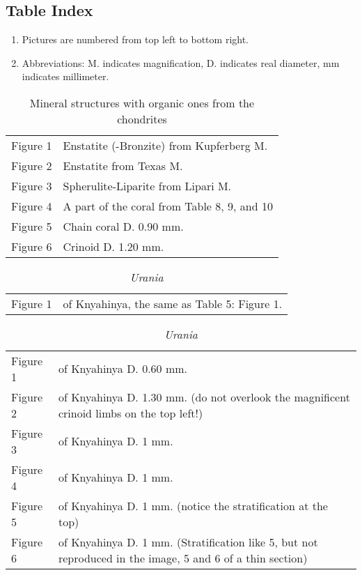 \documentclass[a4paper, 12pt, oneside]{article}
\begin{document}
\subsection{Table Index}
\begin{enumerate}
    \item Pictures are numbered from top left to bottom right.
    \item Abbreviations: M. indicates magnification, D. indicates real diameter, mm indicates millimeter.
\end{enumerate}
\begin{table}[ht!]
\caption{Mineral structures with organic ones from the chondrites}
\centering
\begin{tabular}{ p{2cm} p{10cm} }
\hline
 Figure 1 & Enstatite (-Bronzite) from Kupferberg M. \\
 Figure 2 & Enstatite from Texas M. \\
 Figure 3 & Spherulite-Liparite from Lipari M. \\
 Figure 4 & A part of the coral from Table 8, 9, and 10 \\
 Figure 5 & Chain coral D. 0.90 mm. \\
 Figure 6 & Crinoid D. 1.20 mm.
\end{tabular}
\label{table:1}
\end{table}
\begin{table}[ht!]
\caption{\emph{Urania}}
\centering
\begin{tabular}{ p{2cm} p{10cm} }
\hline
 Figure 1 & of Knyahinya, the same as Table 5: Figure 1.
\end{tabular}
\label{table:2}
\end{table}
\begin{table}[ht!]
\caption{\emph{Urania}}
\centering
\begin{tabular}{ p{2cm} p{10cm} }
\hline
 Figure 1 & of Knyahinya D. 0.60 mm. \\
 Figure 2 & of Knyahinya D. 1.30 mm. (do not overlook the magnificent crinoid limbs on the top left!) \\
 Figure 3 & of Knyahinya D. 1 mm. \\
 Figure 4 & of Knyahinya D. 1 mm. \\
 Figure 5 & of Knyahinya D. 1 mm. (notice the stratification at the top) \\
 Figure 6 & of Knyahinya D. 1 mm. (Stratification like 5, but not reproduced in the image, 5 and 6 of a thin section)
\end{tabular}
\label{table:3}
\end{table}
\end{document}
